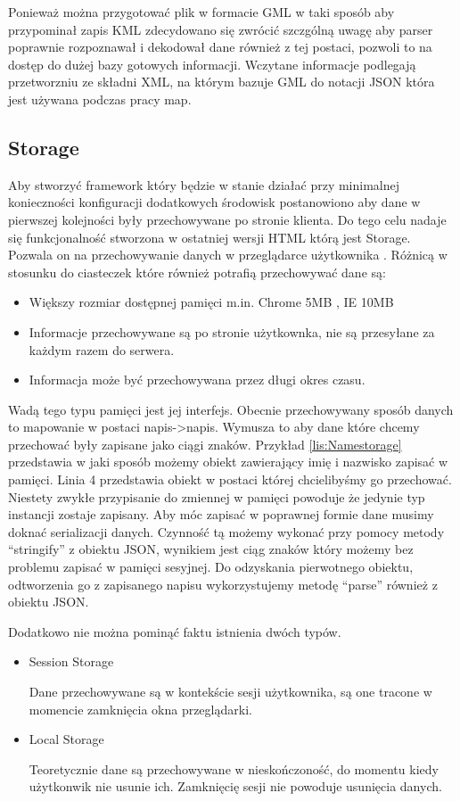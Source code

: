 Ponieważ można przygotować plik w formacie GML w taki sposób aby przypominał zapis KML zdecydowano się zwrócić szczgólną uwagę aby parser poprawnie rozpoznawał i dekodował dane również z tej postaci, pozwoli to na dostęp do dużej bazy gotowych informacji.
Wczytane informacje podlegają przetworzniu ze składni XML, na którym bazuje GML do notacji JSON która jest używana podczas pracy map.

\subsection{Storage}
\label{subsec:storage5}
Aby stworzyć framework który będzie w stanie działać przy minimalnej konieczności konfiguracji dodatkowych środowisk postanowiono aby dane w pierwszej kolejności były przechowywane po stronie klienta. Do tego celu nadaje się funkcjonalność stworzona w ostatniej wersji HTML którą jest Storage. Pozwala on na przechowywanie danych w przeglądarce użytkownika \cite{html5dive}. Różnicą w stosunku do ciasteczek które również potrafią przechowywać dane są:
\begin{itemize}
\item
Większy rozmiar dostępnej pamięci m.in. Chrome 5MB \nocite{chrome5mb}, IE 10MB
\item
Informacje przechowywane są po stronie użytkownka, nie są przesyłane za każdym razem do serwera.
\item
Informacja może być przechowywana przez długi okres czasu.
\end{itemize}

Wadą tego typu pamięci jest jej interfejs. Obecnie przechowywany sposób danych to mapowanie w postaci napis->napis. Wymusza to aby dane które chcemy przechować były zapisane jako ciągi znaków. Przykład \ref{lis:Namestorage} przedstawia w jaki sposób możemy obiekt zawierający imię i nazwisko zapisać w pamięci. Linia 4 przedstawia obiekt w postaci której chcielibyśmy go przechować. Niestety zwykłe przypisanie do zmiennej w pamięci powoduje że jedynie typ instancji zostaje zapisany. Aby móc zapisać w poprawnej formie dane musimy doknać serializacji danych. Czynność tą możemy wykonać przy pomocy metody ``stringify'' z obiektu JSON, wynikiem jest ciąg znaków który możemy bez problemu zapisać w pamięci sesyjnej. Do odzyskania pierwotnego obiektu, odtworzenia go z zapisanego napisu wykorzystujemy metodę ``parse'' również z obiektu JSON.

Dodatkowo nie można pominąć faktu istnienia dwóch typów.
\begin{itemize}

\item
Session Storage

Dane przechowywane są w kontekście sesji użytkownika, są one tracone w momencie zamknięcia okna przeglądarki.

\item
Local Storage

Teoretycznie dane są przechowywane w nieskończoność, do momentu kiedy użytkonwik nie usunie ich. Zamknięcię sesji nie powoduje usunięcia danych.

\end{itemize}

